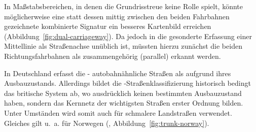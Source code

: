 \documentclass[../main/thesis.tex]{subfiles}
\begin{document}

In Maßstabsbereichen, in denen die Grundrisstreue keine Rolle spielt, könnte möglicherweise eine statt dessen mittig zwischen den beiden Fahrbahnen gezeichnete kombinierte Signatur ein besseres Kartenbild erreichen (Abbildung~\ref{fig:dual-carriageway}).
Da jedoch in \osm{} die gesonderte Erfassung einer Mittellinie als Straßenachse unüblich ist, müssten hierzu zunächst die beiden Richtungsfahrbahnen als zusammengehörig (parallel) erkannt werden.


In Deutschland erfasst die \osm- autobahnähnliche Straßen als  aufgrund ihres Ausbauzustands.
Allerdings bildet die \osm-Straßenklassifizierung historisch bedingt das britische System ab, wo  ausdrücklich keinen bestimmten Ausbauzustand haben, sondern das Kernnetz der wichtigsten Straßen erster Ordnung bilden.
Unter Umständen wird  somit auch für schmalere Landstraßen verwendet.
Gleiches gilt u.~a. für Norwegen (, Abbildung~\ref{fig:trunk-norway}). 
\end{document}
